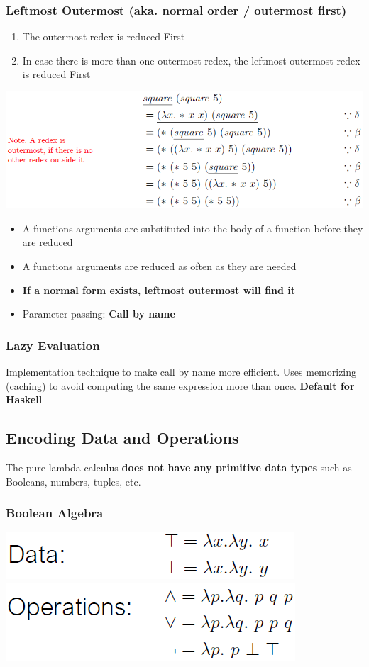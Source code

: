 \subsubsection{Leftmost Outermost (aka. normal order / outermost first)}
\begin{enumerate}
    \item The outermost redex is reduced First
    \item In case there is more than one outermost redex, the leftmost-outermost redex is reduced First
\end{enumerate}
\includegraphics[width=0.9\linewidth]{img/lc_outermost.png}
\begin{itemize}
    \item A functions arguments are substituted into the body of a function before they are reduced
    \item A functions arguments are reduced as often as they are needed
    \item \textbf{If a normal form exists, leftmost outermost will find it}
    \item Parameter passing: \textbf{Call by name}
\end{itemize}

\subsubsection{Lazy Evaluation}
Implementation technique to make call by name more efficient.
Uses memorizing (caching) to avoid computing the same expression more than once.
\textbf{Default for Haskell}

\subsection{Encoding Data and Operations}
The pure lambda calculus \textbf{does not have any primitive data types} such as Booleans, numbers, tuples, etc.\\ 
\subsubsection{Boolean Algebra}
\includegraphics[width=0.5\linewidth]{img/lc_data.png}
\includegraphics[width=0.5\linewidth]{img/lc_operations.png}
